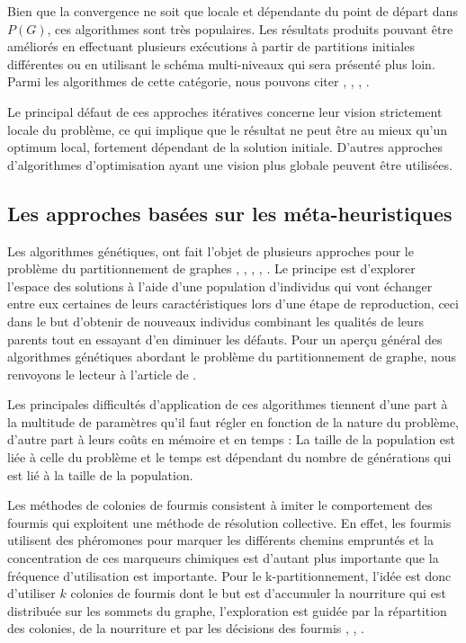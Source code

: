 Bien que la convergence ne soit que locale et dépendante du point de départ dans $P(G)$, ces algorithmes sont très populaires. Les résultats produits pouvant être améliorés en effectuant plusieurs exécutions à partir de partitions initiales différentes ou en utilisant le schéma multi-niveaux qui sera présenté plus loin. Parmi les algorithmes de cette catégorie, nous pouvons citer \citep{FiducciaMattheyses1988}, \citep{Hagen1997}, \citep{KernighanLin1970}, \citep{Krishnamurthy1984}. 

Le principal défaut de ces approches itératives concerne leur vision strictement locale du problème, ce qui implique que le résultat ne peut être au mieux qu'un optimum local, fortement dépendant de la solution initiale. D'autres approches d'algorithmes d'optimisation ayant une vision plus globale peuvent être utilisées.

\subsection*{Les approches basées sur les méta-heuristiques}
 Les algorithmes génétiques, ont fait l'objet de plusieurs approches pour le problème du partitionnement de graphes \citep{BuiMoon1996}, \citep{ChevalierPellegrini2006}, \citep{ChockalingamArunkumar1992}, \citep{Soper2004}, \citep{TalbiBessiere1991}.  Le principe est d'explorer l’espace des solutions à l'aide d'une population d'individus qui vont échanger entre eux certaines de leurs caractéristiques lors d'une étape de reproduction, ceci dans le but d'obtenir de nouveaux individus combinant les qualités de leurs parents tout en essayant d'en diminuer les défauts. Pour un aperçu général des algorithmes génétiques abordant le problème du partitionnement de graphe, nous renvoyons le lecteur à l'article de \citep{Kim2011}.

Les principales difficultés d'application de ces algorithmes tiennent d'une part à la multitude de paramètres qu'il faut régler en fonction de la nature du problème, d'autre part à leurs coûts en mémoire et en temps : La taille de la population est liée à celle du problème et le temps est dépendant du nombre de générations qui est lié à la taille de la population.

Les méthodes de colonies de fourmis consistent à imiter le comportement des fourmis qui exploitent une méthode de résolution collective. En effet, les fourmis utilisent des phéromones pour marquer les différents chemins empruntés et la concentration de ces marqueurs chimiques est
d'autant plus importante que la fréquence d'utilisation est importante. Pour le k-partitionnement, l'idée est donc d'utiliser $k$ colonies de fourmis dont le but est d'accumuler la nourriture qui est distribuée sur les sommets du graphe, l'exploration est guidée par la répartition des colonies, de la nourriture et par les décisions des fourmis \citep{Korosec2004}, \citep{LanghamGrant1999}, \citep{Jovanovic2016}.


